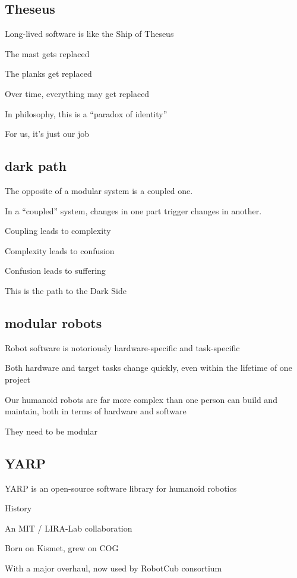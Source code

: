 \subsection{Theseus}

Long-lived software is like the Ship of Theseus

The mast gets replaced

The planks get replaced

Over time, everything may get replaced

In philosophy, this is a ``paradox of identity''

For us, it's just our job


\subsection{dark path}

The opposite of a modular system is a coupled one.

In a ``coupled'' system, changes in one part trigger changes in another.

Coupling leads to complexity

Complexity leads to confusion

Confusion leads to suffering

This is the path to the Dark Side

\subsection{modular robots}

Robot software is notoriously hardware-specific and task-specific

Both hardware and target tasks change quickly, even within the
lifetime of one project

Our humanoid robots are far more complex than one person can build and
maintain, both in terms of hardware and software

They need to be modular


\subsection{YARP}

YARP is an open-source software library  for humanoid robotics

History

An MIT / LIRA-Lab collaboration

Born on Kismet, grew on COG

With a major overhaul, now used by RobotCub consortium

